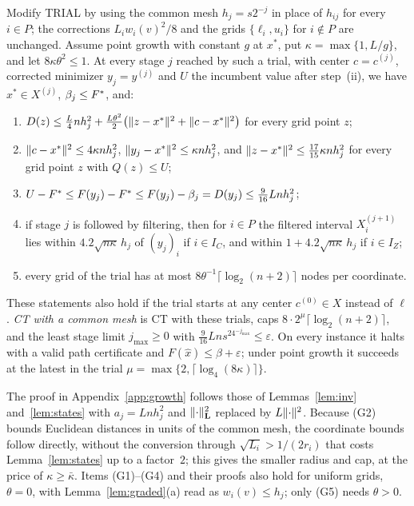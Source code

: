 \begin{lemma}\label{lem:commonmesh}
Modify TRIAL by using the common mesh $h_j=s2^{-j}$ in place of $h_{ij}$ for
every $i\in P$; the corrections $L_iw_i(v)^2/8$ and the grids
$\{\ell_i,u_i\}$ for $i\notin P$ are unchanged. Assume point growth with
constant $g$ at $x^*$, put $\kappa=\max\{1,L/g\}$, and let
$8\kappa\theta^2\le1$. At every stage $j$ reached by such a trial, with
center $c=c^{(j)}$, corrected minimizer $y_j=y^{(j)}$ and $U$ the incumbent
value after step~(ii), we have $x^*\in X^{(j)}$, $\beta_j\le F^{*}$, and:
\begin{enumerate}[label=(G\arabic*)]
\item $D(z)\le\frac L4nh_j^2+\frac{L\theta^2}2\bigl(\lVert z-x^*\rVert^2
+\lVert c-x^*\rVert^2\bigr)$ for every grid point $z$;
\item $\lVert c-x^*\rVert^2\le4\kappa nh_j^2$, $\lVert y_j-x^*\rVert^2\le\kappa nh_j^2$,
and $\lVert z-x^*\rVert^2\le\frac{17}{15}\kappa nh_j^2$ for every grid point $z$
with $Q(z)\le U$;
\item $U-F^{*}\le F(y_j)-F^{*}\le F(y_j)-\beta_j=D(y_j)\le\frac9{16}Lnh_j^2$;
\item if stage $j$ is followed by filtering, then for $i\in P$ the filtered
interval $X_i^{(j+1)}$ lies within $4.2\sqrt{n\kappa}\,h_j$ of $(y_j)_i$ if
$i\in I_C$, and within $1+4.2\sqrt{n\kappa}\,h_j$ if $i\in I_Z$;
\item every grid of the trial has at most
$8\theta^{-1}\lceil\log_2(n+2)\rceil$ nodes per coordinate.
\end{enumerate}
These statements also hold if the trial starts at any center
$c^{(0)}\in X$ instead of $\ell$.
\emph{CT with a common mesh} is CT with these trials, caps
$8\cdot2^\mu\lceil\log_2(n+2)\rceil$, and the least stage limit
$j_{\max}\ge0$ with $\frac9{16}Lns^24^{-j_{\max}}\le\varepsilon$. On every
instance it halts with a valid path certificate and
$F(\hat x)\le\beta+\varepsilon$; under point growth it succeeds at the latest
in the trial
$\mu=\max\{2,\lceil\log_4(8\kappa)\rceil\}$.
\end{lemma}

The proof in Appendix~\ref{app:growth} follows those of
Lemmas~\ref{lem:inv} and~\ref{lem:states} with $a_j=Lnh_j^2$ and
$\lVert \cdot\rVert_{\mathbf L}^2$ replaced by $L\lVert \cdot\rVert^2$. Because (G2) bounds
Euclidean distances in units of the common mesh, the coordinate bounds
follow directly, without the conversion through $\sqrt{L_i}>1/(2r_i)$ that
costs Lemma~\ref{lem:states} up to a factor~$2$; this gives the smaller
radius and cap, at the price of $\kappa\ge\bar\kappa$. Items (G1)--(G4) and
their proofs also hold for uniform grids, $\theta=0$, with
Lemma~\ref{lem:graded}(a) read as $w_i(v)\le h_j$; only (G5) needs
$\theta>0$.

